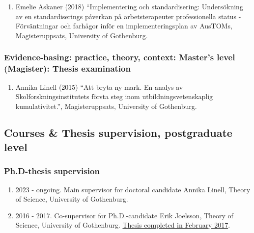 \documentclass[
]{article}
\providecommand{\tightlist}{%
  \setlength{\itemsep}{0pt}\setlength{\parskip}{0pt}}
\begin{document}
\begin{enumerate}
\def\labelenumi{\arabic{enumi}.}
\tightlist
\item
  Emelie Askaner (2018) ``Implementering och standardisering:
  Undersökning av en standardiserings påverkan på arbetsterapeuter
  professionella status - Förväntningar och farhågor inför en
  implementeringsplan av AusTOMs, Magisteruppsats, University of
  Gothenburg.
\end{enumerate}

\hypertarget{evidence-basing-practice-theory-context-masters-level-magister-thesis-examination}{%
\subsubsection{Evidence-basing: practice, theory, context: Master's
level (Magister): Thesis
examination}\label{evidence-basing-practice-theory-context-masters-level-magister-thesis-examination}}

\begin{enumerate}
\def\labelenumi{\arabic{enumi}.}
\tightlist
\item
  Annika Linell (2015) ``Att bryta ny mark. En analys av
  Skolforskningsinstitutets första steg inom utbildningsvetenskaplig
  kumulativitet.'', Magisteruppsats, University of Gothenburg.
\end{enumerate}

\hypertarget{courses-thesis-supervision-postgraduate-level}{%
\subsection{Courses \& Thesis supervision, postgraduate
level}\label{courses-thesis-supervision-postgraduate-level}}

\hypertarget{ph.d-thesis-supervision}{%
\subsubsection{Ph.D-thesis supervision}\label{ph.d-thesis-supervision}}

\begin{enumerate}
\def\labelenumi{\arabic{enumi}.}
\tightlist
\item
  2023 - ongoing. Main supervisor for doctoral candidate Annika Linell,
  Theory of Science, University of Gothenburg.
\item
  2016 - 2017. Co-supervisor for Ph.D.-candidate Erik Joelsson, Theory
  of Science, University of Gothenburg.
  \href{https://gupea.ub.gu.se/handle/2077/51493}{Thesis completed in
  February 2017}.
\end{enumerate}
\end{document}
